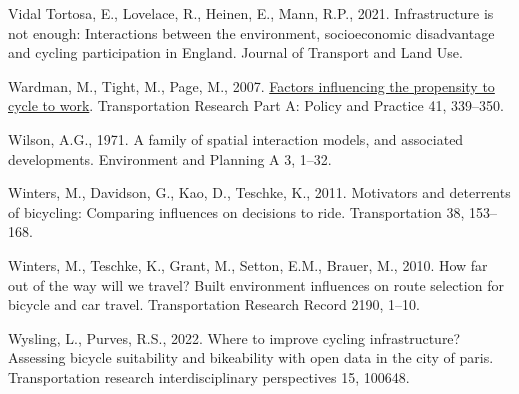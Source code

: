 \documentclass[
]{article}
\newlength{\cslhangindent}
\newlength{\cslentryspacingunit} %
\newenvironment{CSLReferences}[2] %
 {%
  \setlength{\parindent}{0pt}
  \ifodd #1
  \let\oldpar\par
  \def\par{\hangindent=\cslhangindent\oldpar}
  \fi
  \setlength{\parskip}{#2\cslentryspacingunit}
 }%
 {}
\begin{document}
\begin{CSLReferences}{1}{0}
\leavevmode{}%
Vidal Tortosa, E., Lovelace, R., Heinen, E., Mann, R.P., 2021. Infrastructure is not enough: Interactions between the environment, socioeconomic disadvantage and cycling participation in {England}. Journal of Transport and Land Use.

\leavevmode{}%
Wardman, M., Tight, M., Page, M., 2007. \href{https://doi.org/10.1016/j.tra.2006.09.011}{Factors influencing the propensity to cycle to work}. Transportation Research Part A: Policy and Practice 41, 339--350.

\leavevmode{}%
Wilson, A.G., 1971. A family of spatial interaction models, and associated developments. Environment and Planning A 3, 1--32.

\leavevmode{}%
Winters, M., Davidson, G., Kao, D., Teschke, K., 2011. Motivators and deterrents of bicycling: Comparing influences on decisions to ride. Transportation 38, 153--168.

\leavevmode{}%
Winters, M., Teschke, K., Grant, M., Setton, E.M., Brauer, M., 2010. How far out of the way will we travel? Built environment influences on route selection for bicycle and car travel. Transportation Research Record 2190, 1--10.

\leavevmode{}%
Wysling, L., Purves, R.S., 2022. Where to improve cycling infrastructure? Assessing bicycle suitability and bikeability with open data in the city of paris. Transportation research interdisciplinary perspectives 15, 100648.

\end{CSLReferences}
\end{document}
